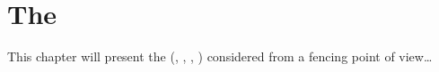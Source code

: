 \chapter{The \Si{} \Yao}\label{ch:siyao}

This chapter will present the \Si{} \Yao{} (\Zhan, \Nian, \Lian, \Sui) considered from a fencing point of view\ldots
